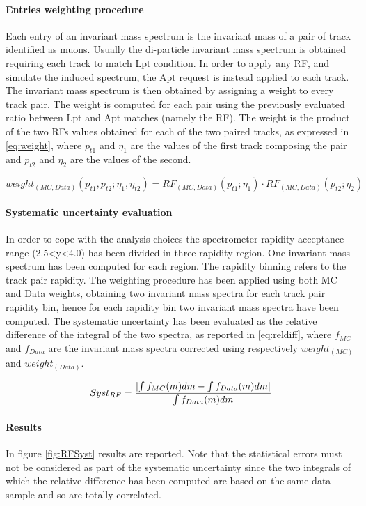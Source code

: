 \paragraph{Entries weighting procedure}
Each entry of an invariant mass spectrum is the invariant mass of a pair of track identified as muons. Usually the di-particle invariant mass spectrum is obtained requiring each track to match Lpt condition. In order to apply any RF, and simulate the induced spectrum, the Apt request is instead applied to each track. The invariant mass spectrum is then obtained by assigning a weight to every track pair. The weight is computed for each pair using the previously evaluated ratio between Lpt and Apt matches (namely the RF). The weight is the product of the two RFs values obtained for each of the two paired tracks, as expressed in \ref{eq:weight}, where $p_{t1}$ and $\eta_{1}$ are the values of the first track composing the pair and $p_{t2}$ and $\eta_{2}$ are the values of the second.

\begin{equation}\label{eq:weight}
	weight_{(MC,Data)}(p_{t1},p_{t2};\eta_{1},\eta_{t2})=RF_{(MC,Data)}(p_{t1};\eta_{1})\cdot RF_{(MC,Data)}(p_{t2};\eta_{2})
\end{equation}

\paragraph{Systematic uncertainty evaluation}
In order to cope with the analysis choices the spectrometer rapidity acceptance range (2.5<y<4.0) has been divided in three rapidity region. One invariant mass spectrum has been computed for each region. The rapidity binning refers to the track pair rapidity.
The weighting procedure has been applied using both MC and Data weights, obtaining two invariant mass spectra for each track pair rapidity bin, hence for each rapidity bin two invariant mass spectra have been computed. The systematic uncertainty has been evaluated as the relative difference of the integral of the two spectra, as reported in \ref{eq:reldiff}, where $f_{MC}$ and $f_{Data}$ are the invariant mass spectra corrected using respectively $weight_{(MC)}$ and $weight_{(Data)}$.

\begin{equation}\label{eq:reldiff}
	Syst_{RF}=\frac{\lvert\int{f_{MC}(m)dm}-\int{f_{Data}(m)dm}\rvert}{\int{f_{Data}(m)dm}}
\end{equation}

\paragraph{Results}
In figure \ref{fig:RFSyst} results are reported. Note that the statistical errors must not be considered as part of the systematic uncertainty since the two integrals of which the relative difference has been computed are based on the same data sample and so are totally correlated.

